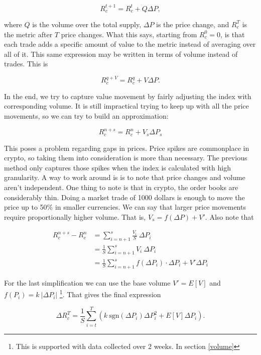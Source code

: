 \documentclass[11pt,a4paper]{article}
\begin{document}
$$
R_c^{t+1} = R_c^{t} + Q \Delta P,
$$

where $Q$ is the volume over the total supply, $\Delta P$ is the price change, and $R_c^{T}$ is the metric after $T$ price changes. What this says, starting from $R_c^{0} = 0$, is that each trade adds a specific amount of value to the metric instead of averaging over all of it. This same expression may be written in terms of volume instead of trades. This is

$$
R_c^{q+V} = R_c^{q} + V \Delta P.
$$

In the end, we try to capture value movement by fairly adjusting the index with corresponding volume. It is still impractical trying to keep up with all the price movements, so we can try to build an approximation:

$$
R_c^{n+s} = R_c^{n} + V_{s} \Delta P_{s}
$$

This poses a problem regarding gaps in prices. Price spikes are commonplace in crypto, so taking them into consideration is more than necessary. The previous method only captures those spikes when the index is calculated with high granularity. A way to work around is is to note that price changes and volume aren't independent. One thing to note is that in crypto, the order books are considerably thin. Doing a market trade of 1000 dollars is enough to move the price up to 50\% in smaller currencies. We can say that larger price movements require proportionally higher volume. That is, $V_{s} = f(\Delta P) + V'$. Also note that

\begin{equation}
\begin{split}
R_c^{n+s} - R_c^{n} &= \sum_{i=n+1}^{s} \frac{V_i}{S}\ \Delta P_i \\
  &= \frac{1}{S} \sum_{i=n+1}^{s} V_i\ \Delta P_i \\
  &= \frac{1}{S} \sum_{i=n+1}^{s} f( \Delta P_i )  \cdot \Delta P_i + V' \Delta P_i
\end{split}
\end{equation}

For the last simplification we can use the base volume $V' = E[V]$ and $f(P_i) = k\ | \Delta P_i |$ \footnote{This is supported with data collected over 2 weeks. In section \ref{volume}}. That gives the final expression

$$
\Delta R_c^T = \frac{1}{S} \sum_{i=t}^{T} \left( k\ \text{sgn} (\Delta P_i) \Delta P_i^2  + E \left[ V \right] \Delta P_i \right).
$$
\end{document}
